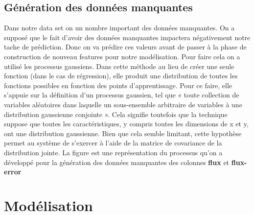 \subsection{Génération des données manquantes}
 Dans notre data set on un nombre important des données manquantes. On a supposé que le fait d’avoir des données manquantes impactera négativement notre tache de prédiction. Donc on va prédire ces valeurs avant de passer à la phase de construction de nouveau features pour notre modélisation. Pour faire cela on a utilisé les processus gaussiens. Dans cette méthode au lieu de créer une seule fonction  (dans le cas de régression), elle produit une distribution de toutes les fonctions possibles en fonction des points d'apprentissage. Pour ce faire, elle s’appuie sur la définition d’un processus gaussien, tel que « toute collection de variables aléatoires dans laquelle un sous-ensemble arbitraire de variables à une distribution gaussienne conjointe ». Cela signifie toutefois que la technique suppose que toutes les caractéristiques, y compris toutes les dimensions de x et y, ont une distribution gaussienne. Bien que cela semble limitant, cette hypothèse permet au système de s'exercer à l'aide de la matrice de covariance de la distribution jointe.
La figure est une représentation du processus qu'on a développé pour la génération des données manquantes  des colonnes \textbf{flux} et \textbf{flux-error}






\section{Modélisation}

